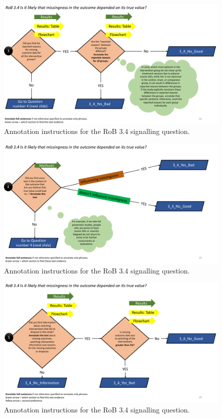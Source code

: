 \documentclass[sn-mathphys,Numbered]{sn-jnl}%
\begin{document}
\begin{figure}[hbt]
    \centering
    \includegraphics[width=\textwidth]{figures/3_4_3.pdf}
    \caption{Annotation instructions for the RoB 3.4 signalling question.}
    \label{fig:3_4_3}
\end{figure}


\begin{figure}[hbt]
    \centering
    \includegraphics[width=\textwidth]{figures/3_4_4.pdf}
    \caption{Annotation instructions for the RoB 3.4 signalling question.}
    \label{fig:3_4_4}
\end{figure}


\begin{figure}[hbt]
    \centering
    \includegraphics[width=\textwidth]{figures/3_4_5.pdf}
    \caption{Annotation instructions for the RoB 3.4 signalling question.}
    \label{fig:3_4_5}
\end{figure}
%
%
%
\clearpage
%
%
%
\end{document}
